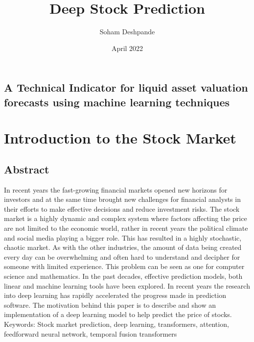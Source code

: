 \documentclass{article}
\title{Deep Stock Prediction}
\author{Soham Deshpande}
\date{April 2022}
\begin{document}
\maketitle
\subsection*{A Technical Indicator for  liquid asset valuation forecasts using  machine learning techniques }



\clearpage
\tableofcontents

\clearpage

\section {Introduction to the Stock Market}
\subsection{Abstract}
\normalsize{In recent years the fast-growing financial markets opened new horizons for\\ investors and at the same time brought new challenges for financial analysts in their efforts to make effective decisions and reduce investment risks.
The stock market is a highly dynamic and complex system where factors affecting the price are not limited to the economic world, rather in recent years the political climate and social media playing a bigger role. This has resulted in a highly stochastic, chaotic market. As with the other industries, the amount of data being created every day can be overwhelming and often hard to understand and decipher for someone with limited experience. This problem can be seen as one for computer science and mathematics.
In the past decades, effective prediction models, both linear and machine learning tools have been explored. In recent years the research into deep learning has rapidly accelerated the progress made in prediction software. The motivation behind this paper is to describe and show an implementation of a deep learning model to help predict the price of stocks.
\\
Keywords:
Stock market prediction, deep learning, transformers, attention, feedforward neural network, temporal fusion transformers
}
\end{document}
